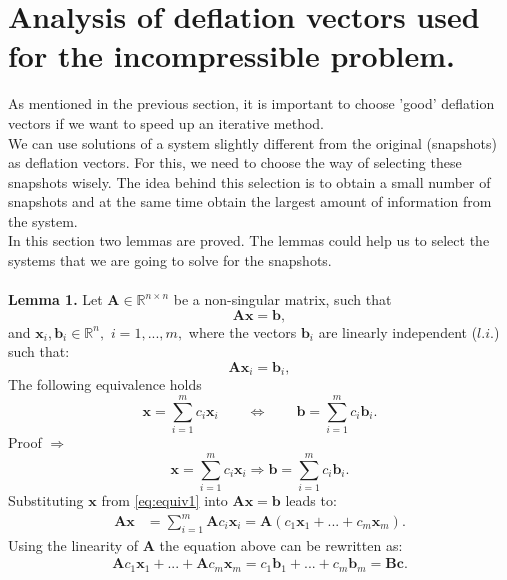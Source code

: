 \documentclass[12pt]{article}
\numberwithin{equation}{section}
\begin{document}
\section{Analysis of deflation vectors used for the incompressible problem.}\label{as}
As mentioned in the previous section, it is important to choose 'good' deflation vectors if we want to speed up an iterative method.\\ 
We can use solutions of a system slightly different from the original (snapshots) as deflation vectors.
For this, we need to choose the way of selecting these snapshots
wisely. The idea behind this selection is to obtain a small number of snapshots and at the same time
obtain the largest amount of information from the system.\\
In this section two lemmas are proved. The lemmas could help us to select the systems that we are going to solve for
the snapshots.\\\\
\textbf{Lemma 1.} 
Let $\mathbf{A} \in \mathbb{R}^{n\times n}$ be a non-singular matrix, such that
\begin{equation}\label{eq:ls}
\mathbf{A}\mathbf{x}=\mathbf{b},
\end{equation}
and $ \mathbf{x}_i, \mathbf{b}_i \in \mathbb{R}^{n},$ $i=1,...,m,$ where the vectors $\mathbf{b}_i$ are 
linearly independent ($l.i.$) such that: 
\begin{equation}\label{eq:lieq}
\mathbf{A}\mathbf{x}_i=\mathbf{b}_i,
\end{equation}
The following equivalence holds
\begin{equation}\label{eq:equiv}
\mathbf{x}=\sum_{i=1}^m {c}_i\mathbf{x}_i \qquad
\Leftrightarrow \qquad
\mathbf{b}=\sum_{i=1}^m {c}_i\mathbf{b}_i.
\end{equation}
Proof $\Rightarrow$
\begin{equation}\label{eq:equiv1}
\mathbf{x}=\sum_{i=1}^m {c}_i\mathbf{x}_i 
\Rightarrow 
\mathbf{b}=\sum_{i=1}^m {c}_i\mathbf{b}_i.
\end{equation}
Substituting $\mathbf{x}$ from \eqref{eq:equiv1} into $\mathbf{A}\mathbf{x}=\mathbf{b}$ leads to:
\begin{align*}
\mathbf{A}\mathbf{x}&=\sum_{i=1}^m \mathbf{A}{c}_i\mathbf{x}_i=\mathbf{A}(c_1\mathbf{x}_1+...+c_m\mathbf{x}_m).
\end{align*}
Using the linearity of $\mathbf{A}$ the equation above can be rewritten as:
\begin{align}\label{eq:bc}
\mathbf{A}c_1\mathbf{x}_1+...+\mathbf{A}c_m\mathbf{x}_m
=c_1\mathbf{b}_1+...+c_m\mathbf{b}_m=\mathbf{B}\mathbf{c}.
\end{align}
\end{document}
